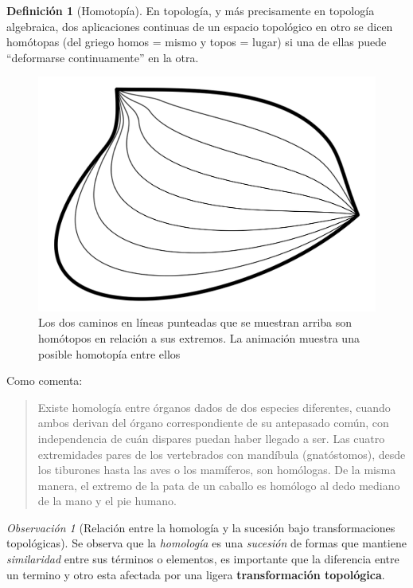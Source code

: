 \documentclass[
  11pt,
]{krantz}
\theoremstyle{definition}
\newtheorem{definition}{Definición}[chapter]
\theoremstyle{definition}
\theoremstyle{definition}
\theoremstyle{definition}
\theoremstyle{remark}
\newtheorem*{remark}{Observación}
\begin{document}
\begin{definition}[Homotopía]
\protect\hypertarget{def:homotopia}{}\label{def:homotopia}En topología, y más precisamente en topología algebraica, dos aplicaciones continuas de un espacio topológico en otro se dicen homótopas (del griego homos = mismo y topos = lugar) si una de ellas puede ``deformarse continuamente'' en la otra.
\end{definition}

\begin{figure}[!ht]

{\centering \includegraphics[width=0.5\linewidth]{homotopia} 

}

\caption{Los dos caminos en líneas punteadas que se muestran arriba son homótopos en relación a sus extremos. La animación muestra una posible homotopía entre ellos}\label{fig:homotopia}
\end{figure}

Como \citet{homology} comenta:

\begin{quote}
Existe homología entre órganos dados de dos especies diferentes, cuando ambos derivan del órgano correspondiente de su antepasado común, con independencia de cuán dispares puedan haber llegado a ser. Las cuatro extremidades pares de los vertebrados con mandíbula (gnatóstomos), desde los tiburones hasta las aves o los mamíferos, son homólogas. De la misma manera, el extremo de la pata de un caballo es homólogo al dedo mediano de la mano y el pie humano.
\end{quote}

\begin{remark}[Relación entre la homología y la sucesión bajo transformaciones topológicas]

Se observa que la \emph{homología}  es una \emph{sucesión} de formas que mantiene \emph{similaridad} entre sus términos o elementos, es importante que la diferencia entre un termino y otro esta afectada por una ligera \textbf{transformación topológica}.

\end{remark}
\end{document}
